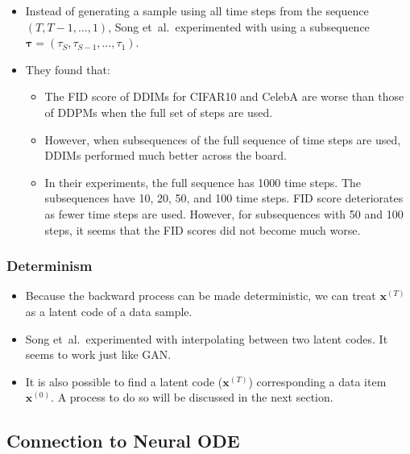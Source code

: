 \documentclass[10pt]{article}
\newcommand{\ve}[1]{\mathbf{#1}}
\newcommand{\ves}[1]{\boldsymbol{#1}}
\newcommand{\etal}{{et~al.}}
\begin{document}
\begin{itemize}
  \item Instead of generating a sample using all time steps from the sequence $(T, T-1, \dotsc, 1)$, Song \etal\ experimented with using a subsequence $\ves{\tau} = (\tau_S, \tau_{S-1}, \dotsc, \tau_1)$.
  
  \item They found that:
  \begin{itemize}
    \item The FID score of DDIMs for CIFAR10 and CelebA are worse than those of DDPMs when the full set of steps are used.
    
    \item However, when subsequences of the full sequence of time steps are used, DDIMs performed much better across the board.
    
    \item In their experiments, the full sequence has 1000 time steps. The subsequences have 10, 20, 50, and 100 time steps. FID score deteriorates as fewer time steps are used. However, for subsequences with 50 and 100 steps, it seems that the FID scores did not become much worse.
  \end{itemize}
\end{itemize}

\subsubsection{Determinism}

\begin{itemize}
  \item Because the backward process can be made deterministic, we can treat $\ve{x}^{(T)}$ as a latent code of a data sample.
  
  \item Song \etal\ experimented with interpolating between two latent codes. It seems to work just like GAN.
  
  \item It is also possible to find a latent code ($\ve{x}^{(T)}$) corresponding a data item $\ve{x}^{(0)}$. A process to do so will be discussed in the next section.
\end{itemize}

\subsection{Connection to Neural ODE}
\end{document}

